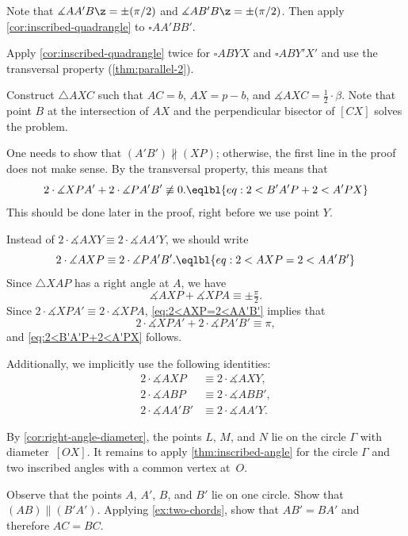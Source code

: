 Note that $\measuredangle AA'B\z=\pm\tfrac\pi2$ and $\measuredangle AB'B\z=\pm\tfrac\pi2$.
Then apply \ref{cor:inscribed-quadrangle}
to $\square AA'BB'$.

Apply \ref{cor:inscribed-quadrangle} twice for $\square ABYX$ and $\square ABY'X'$ and use the transversal property (\ref{thm:parallel-2}).

Construct $\triangle AXC$ such that $AC=b$, $AX=p-b$, and $\measuredangle AXC=\tfrac12\cdot \beta$.
Note that point $B$ at the intersection of $AX$ and the perpendicular bisector of $[CX]$ solves the problem. 


One needs to show that $(A'B') \nparallel (XP)$; otherwise, the first line in the proof does not make sense.
By the transversal property, this means that
\[
2 \cdot \measuredangle XPA' + 2 \cdot \measuredangle PA'B' \not\equiv 0.
\eqlbl{eq:2<B'A'P+2<A'PX}
\]
This should be done later in the proof, right before we use point $Y$.

Instead of $2 \cdot \measuredangle AXY \equiv 2 \cdot \measuredangle AA'Y$, we should write
\[
2 \cdot \measuredangle AXP \equiv 2 \cdot \measuredangle PA'B'.
\eqlbl{eq:2<AXP=2<AA'B'}
\]
Since $\triangle XAP$ has a right angle at $A$, we have
\[
\measuredangle AXP + \measuredangle XPA \equiv \pm \tfrac{\pi}{2}.
\]
Since $2 \cdot \measuredangle XPA' \equiv 2 \cdot \measuredangle XPA$, \ref{eq:2<AXP=2<AA'B'} implies that
\[
2 \cdot \measuredangle XPA' + 2 \cdot \measuredangle PA'B' \equiv \pi,
\]
and \ref{eq:2<B'A'P+2<A'PX} follows.

Additionally, we implicitly use the following identities:
\begin{align*}
2 \cdot \measuredangle AXP &\equiv 2 \cdot \measuredangle AXY, \\
2 \cdot \measuredangle ABP &\equiv 2 \cdot \measuredangle ABB', \\
2 \cdot \measuredangle AA'B' &\equiv 2 \cdot \measuredangle AA'Y.
\end{align*}

By \ref{cor:right-angle-diameter},
the points $L$, $M$, and $N$ lie on the circle $\Gamma$ with diameter~$[OX]$.
It remains to apply \ref{thm:inscribed-angle} for the circle $\Gamma$ 
and two inscribed angles with a common vertex at~$O$.

Observe that the points $A$, $A'$, $B$, and $B'$ lie on one circle.
Show that $(AB)\parallel (B'A')$.
Applying \ref{ex:two-chords}, show that $AB'=BA'$ and therefore $AC=BC$.


